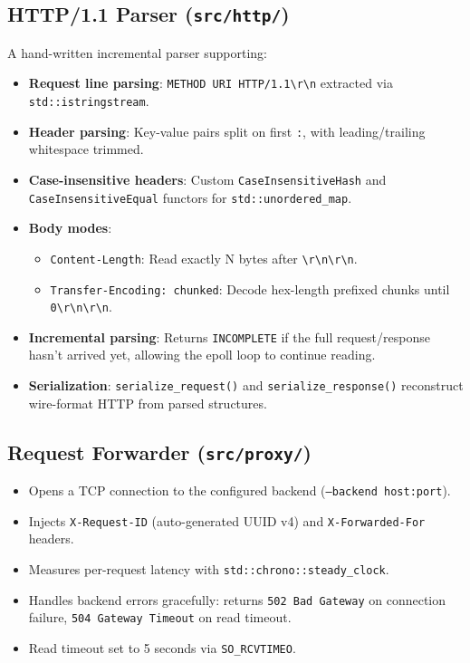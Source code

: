 \documentclass[11pt, a4paper]{article}
\begin{document}
\subsection{HTTP/1.1 Parser (\texttt{src/http/})}
A hand-written incremental parser supporting:
\begin{itemize}
    \item \textbf{Request line parsing}: \texttt{METHOD URI HTTP/1.1\textbackslash r\textbackslash n} extracted via \texttt{std::istringstream}.
    \item \textbf{Header parsing}: Key-value pairs split on first \texttt{:}, with leading/trailing whitespace trimmed.
    \item \textbf{Case-insensitive headers}: Custom \texttt{CaseInsensitiveHash} and \texttt{CaseInsensitiveEqual} functors for \texttt{std::unordered\_map}.
    \item \textbf{Body modes}:
    \begin{itemize}
        \item \texttt{Content-Length}: Read exactly N bytes after \texttt{\textbackslash r\textbackslash n\textbackslash r\textbackslash n}.
        \item \texttt{Transfer-Encoding: chunked}: Decode hex-length prefixed chunks until \texttt{0\textbackslash r\textbackslash n\textbackslash r\textbackslash n}.
    \end{itemize}
    \item \textbf{Incremental parsing}: Returns \texttt{INCOMPLETE} if the full request/response hasn't arrived yet, allowing the epoll loop to continue reading.
    \item \textbf{Serialization}: \texttt{serialize\_request()} and \texttt{serialize\_response()} reconstruct wire-format HTTP from parsed structures.
\end{itemize}

\subsection{Request Forwarder (\texttt{src/proxy/})}
\begin{itemize}
    \item Opens a TCP connection to the configured backend (\texttt{--backend host:port}).
    \item Injects \texttt{X-Request-ID} (auto-generated UUID v4) and \texttt{X-Forwarded-For} headers.
    \item Measures per-request latency with \texttt{std::chrono::steady\_clock}.
    \item Handles backend errors gracefully: returns \texttt{502 Bad Gateway} on connection failure, \texttt{504 Gateway Timeout} on read timeout.
    \item Read timeout set to 5 seconds via \texttt{SO\_RCVTIMEO}.
\end{itemize}
\end{document}
